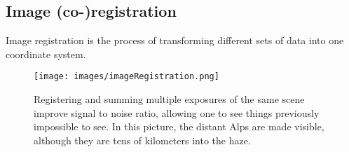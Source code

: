 \subsection{Image (co-)registration}
Image registration is the process of transforming different sets of data into one coordinate system.

\begin{figure}[H]
    \centering
    \texttt{[image: images/imageRegistration.png]}
    \caption{Registering and summing multiple exposures of the same scene improve signal to noise ratio, allowing one to see things previously impossible to see. In this picture, the distant Alps are made visible, although they are tens of kilometers into the haze.}
\end{figure}